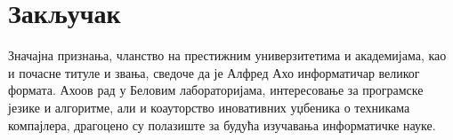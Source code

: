 \documentclass[a4paper]{article}
\begin{document}
\section{Закључак}
\label{sec:zakljucak}
Значајна признања, чланство на престижним универзитетима и академијама, као и почасне титуле и звања, сведоче да је Алфред Ахо информатичар великог формата. Ахоов рад у Беловим лабораторијама, интересовање за програмске језике и алгоритме, али и коауторство иновативних уџбеника о техникама компајлера, драгоцено су полазиште за будућа изучавања информатичке науке.
\appendix
 

\end{document}
